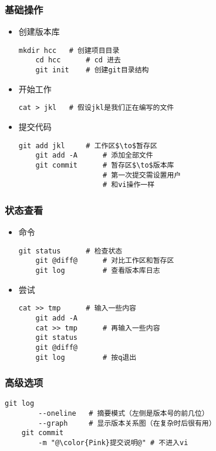 \begin{CJK}{UTF8}{gbsn}
\begin{frame} [fragile]
	\frametitle{基础操作}
	\linespread{1.25}
	\begin{itemize}
	\item 创建版本库
	\begin{lstlisting}[style=bashstyle, gobble=4, texcl]
	mkdir hcc	# 创建项目目录
	cd hcc		# cd 进去
	git init	# 创建git目录结构
	\end{lstlisting}
	\item 开始工作
	\begin{lstlisting}[style=bashstyle, gobble=4, texcl]
	cat > jkl	# 假设jkl是我们正在编写的文件
	\end{lstlisting}
	\item 提交代码
	\begin{lstlisting}[style=bashstyle, gobble=4, texcl]
	git add jkl		# 工作区$\to$暂存区
	git add -A		# 添加全部文件
	git commit		# 暂存区$\to$版本库
					# 第一次提交需设置用户
					# 和vi操作一样
	\end{lstlisting}
	\end{itemize}
\end{frame}

\begin{frame} [fragile]
	\frametitle{状态查看}
	\linespread{1.25}
	\begin{itemize}
	\item 命令
	\begin{lstlisting}[style=bashstyle, gobble=4, texcl, escapechar=@]
	git status		# 检查状态
	git @diff@		# 对比工作区和暂存区
	git log			# 查看版本库日志
	\end{lstlisting}
	\item 尝试
	\begin{lstlisting}[style=bashstyle, gobble=4, texcl, escapechar=@]
	cat >> tmp		# 输入一些内容
	git add -A
	cat >> tmp		# 再输入一些内容
	git status
	git @diff@
	git log			# 按q退出
	\end{lstlisting}
	\end{itemize}
\end{frame}

\begin{frame} [fragile]
	\frametitle{高级选项}
	\linespread{1.5}
	\begin{lstlisting}[style=bashstyle, gobble=4, texcl, escapechar=@]
	git log
		--oneline	# 摘要模式（左侧是版本号的前几位）
		--graph		# 显示版本关系图（在复杂时后很有用）
	git commit
		-m "@\color{Pink}提交说明@"	# 不进入vi
	\end{lstlisting}
\end{frame}


\end{CJK}
